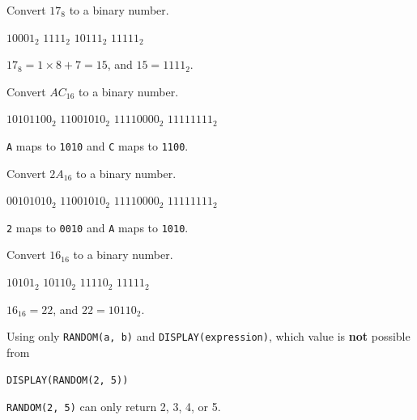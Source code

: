 \newpage 

\question[5]
Convert \(17_{8}\) to a binary number.
\begin{choices}
  \choice \(10001_{2}\)
  \CorrectChoice \(1111_{2}\)
  \choice \(10111_{2}\)
  \choice \(11111_{2}\)
\end{choices}
\begin{solution}
  \(17_{8} = 1 \times 8 + 7 = 15\), and \(15 = 1111_{2}\).
\end{solution}


\question[5]
Convert \(AC_{16}\) to a binary number.
\begin{choices}
  \CorrectChoice \(10101100_{2}\)
  \choice \(11001010_{2}\)
  \choice \(11110000_{2}\)
  \choice \(11111111_{2}\)
\end{choices}
\begin{solution}
  \texttt{A} maps to \texttt{1010} and \texttt{C} maps to \texttt{1100}.
\end{solution}

\question[5]
Convert \(2A_{16}\) to a binary number.
\begin{choices}
  \CorrectChoice \(00101010_{2}\)
  \choice \(11001010_{2}\)
  \choice \(11110000_{2}\)
  \choice \(11111111_{2}\)
\end{choices}
\begin{solution}
  \texttt{2} maps to \texttt{0010} and \texttt{A} maps to \texttt{1010}.
\end{solution}

\question[5]
Convert \(16_{16}\) to a binary number.
\begin{choices}
  \choice \(10101_{2}\)
  \CorrectChoice \(10110_{2}\)
  \choice \(11110_{2}\)
  \choice \(11111_{2}\)
\end{choices}
\begin{solution}
  \(16_{16} = 22\), and \(22 = 10110_{2}\).
\end{solution}

\newpage 

\question[5]
Using only \texttt{RANDOM(a, b)} and \texttt{DISPLAY(expression)}, which value is \textbf{not} possible from
\begin{lstlisting}[style=pseudo]
DISPLAY(RANDOM(2, 5))
\end{lstlisting}
\begin{choices}
\end{choices}
\begin{solution}
  \texttt{RANDOM(2, 5)} can only return 2, 3, 4, or 5.
\end{solution}

